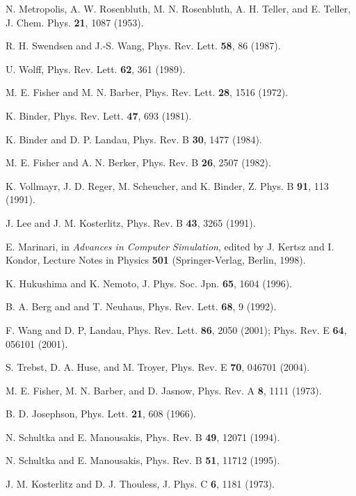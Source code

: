 \documentclass[draft,numberedheadings]{aipproc}
\begin{document}
\begin{thebibliography}{999}
N. Metropolis, A. W. Rosenbluth, M. N. Rosenbluth, A. H. Teller, and E. Teller, 
J. Chem. Phys. {\bf 21}, 1087 (1953). 

R. H. Swendsen and J.-S. Wang, Phys. Rev. Lett. {\bf 58}, 86 (1987).

U. Wolff, Phys. Rev. Lett. {\bf 62}, 361 (1989).

M. E. Fisher and M. N. Barber, Phys. Rev. Lett. {\bf 28}, 1516 (1972).

K. Binder, Phys. Rev. Lett. {\bf 47}, 693 (1981).

K. Binder and D. P. Landau, Phys. Rev. B {\bf 30}, 1477 (1984).

M. E. Fisher and A. N. Berker, Phys. Rev. B {\bf 26}, 2507 (1982).

K. Vollmayr, J. D. Reger, M. Scheucher, and K. Binder, Z. Phys. B {\bf 91}, 113 (1991).

J. Lee and J. M. Kosterlitz, Phys. Rev. B {\bf 43}, 3265 (1991).

E. Marinari, in {\it Advances in Computer Simulation}, edited by J. Kertsz and I. Kondor, 
Lecture Notes in Physics {\bf 501} (Springer-Verlag, Berlin, 1998).

K. Hukushima and K. Nemoto, J. Phys. Soc. Jpn. {\bf 65}, 1604 (1996).

B. A. Berg and and T. Neuhaus, Phys. Rev. Lett. {\bf 68}, 9 (1992).

F. Wang and D. P, Landau, Phys. Rev. Lett. {\bf 86}, 2050 (2001); Phys. Rev. E {\bf 64}, 056101 (2001).

S. Trebst, D. A. Huse, and M. Troyer, Phys. Rev. E {\bf 70}, 046701 (2004).

M. E. Fisher, M. N. Barber, and D. Jasnow, Phys. Rev. A {\bf 8}, 1111 (1973).

B. D. Josephson, Phys. Lett. {\bf 21}, 608 (1966). 

N. Schultka and E. Manousakis, Phys. Rev. B {\bf 49}, 12071 (1994).

N. Schultka and E. Manousakis, Phys. Rev. B {\bf 51}, 11712 (1995).

J. M. Kosterlitz and D. J. Thouless, J. Phys. C {\bf 6}, 1181 (1973).


\end{thebibliography}
\end{document}
